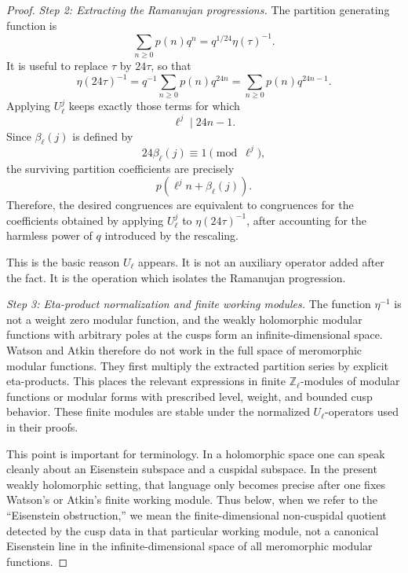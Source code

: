 \documentclass[12pt]{amsart}
\theoremstyle{definition}
\theoremstyle{remark}
\begin{document}
\begin{proof}
\smallskip
\noindent
\emph{Step 2: Extracting the Ramanujan progressions.}
The partition generating function is
\[
        \sum_{n\geq0}p(n)q^n=q^{1/24}\eta(\tau)^{-1}.
\]
It is useful to replace \(\tau\) by \(24\tau\), so that
\[
        \eta(24\tau)^{-1}
        =
        q^{-1}\sum_{n\geq0}p(n)q^{24n}
        =
        \sum_{n\geq0}p(n)q^{24n-1}.
\]
Applying \(U_\ell^j\) keeps exactly those terms for which
\[
        \ell^j\mid 24n-1.
\]
Since \(\beta_\ell(j)\) is defined by
\[
        24\beta_\ell(j)\equiv1\pmod{\ell^j},
\]
the surviving partition coefficients are precisely
\[
        p(\ell^j n+\beta_\ell(j)).
\]
Therefore, the desired congruences are equivalent to congruences for the
coefficients obtained by applying \(U_\ell^j\) to
\(\eta(24\tau)^{-1}\), after accounting for the harmless power of \(q\)
introduced by the rescaling.

This is the basic reason \(U_\ell\) appears.  It is not an auxiliary
operator added after the fact. It is the operation which isolates the
Ramanujan progression.

\smallskip
\noindent
\emph{Step 3: Eta-product normalization and finite working modules.}
The function \(\eta^{-1}\) is not a weight zero modular function, and
the weakly holomorphic modular functions with arbitrary poles at the
cusps form an infinite-dimensional space.  Watson and Atkin therefore do
not work in the full space of meromorphic modular functions.  They first
multiply the extracted partition series by explicit eta-products.  This
places the relevant expressions in finite \(\mathbb Z_\ell\)-modules of
modular functions or modular forms with prescribed level, weight, and
bounded cusp behavior.  These finite modules are stable under the
normalized \(U_\ell\)-operators used in their proofs.

This point is important for terminology.  In a holomorphic space one can
speak cleanly about an Eisenstein subspace and a cuspidal subspace.  In
the present weakly holomorphic setting, that language only becomes
precise after one fixes Watson's or Atkin's finite working module.  Thus
below, when we refer to the ``Eisenstein obstruction,'' we mean the
finite-dimensional non-cuspidal quotient detected by the cusp data in
that particular working module, not a canonical Eisenstein line in the
infinite-dimensional space of all meromorphic modular functions.


\end{proof}
\end{document}
